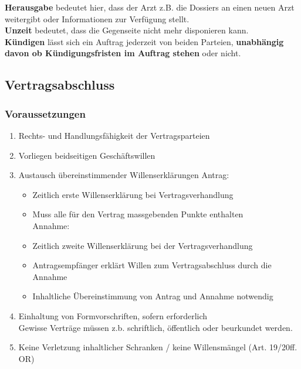\textbf{Herausgabe} bedeutet hier, dass der Arzt z.B. die Dossiers an
einen neuen Arzt weitergibt oder Informationen zur Verfügung stellt.\\
\textbf{Unzeit} bedeutet, dass die Gegenseite nicht mehr disponieren
kann.\\
\textbf{Kündigen} lässt sich ein Auftrag jederzeit von beiden Parteien,
\textbf{unabhängig davon ob Kündigungsfristen im Auftrag stehen} oder
nicht.

\hypertarget{vertragsabschluss}{%
\subsection{Vertragsabschluss}\label{vertragsabschluss}}

\hypertarget{voraussetzungen}{%
\subsubsection{Voraussetzungen}\label{voraussetzungen}}

\begin{enumerate}
\def\labelenumi{\arabic{enumi}.}
\tightlist
\item
  Rechts- und Handlungsfähigkeit der Vertragsparteien
\item
  Vorliegen beidseitigen Geschäftswillen
\item
  Austausch übereinstimmender Willenserklärungen Antrag:

  \begin{itemize}
  \tightlist
  \item
    Zeitlich erste Willenserklärung bei Vertragsverhandlung
  \item
    Muss alle für den Vertrag massgebenden Punkte enthalten\\
    Annahme:
  \item
    Zeitlich zweite Willenserklärung bei der Vertragsverhandlung
  \item
    Antragsempfänger erklärt Willen zum Vertragsabschluss durch die
    Annahme
  \item
    Inhaltliche Übereinstimmung von Antrag und Annahme notwendig
  \end{itemize}
\item
  Einhaltung von Formvorschriften, sofern erforderlich\\
  Gewisse Verträge müssen z.b. schriftlich, öffentlich oder beurkundet
  werden.
\item
  Keine Verletzung inhaltlicher Schranken / keine Willensmängel (Art.
  19/20ff. OR)
\end{enumerate}

